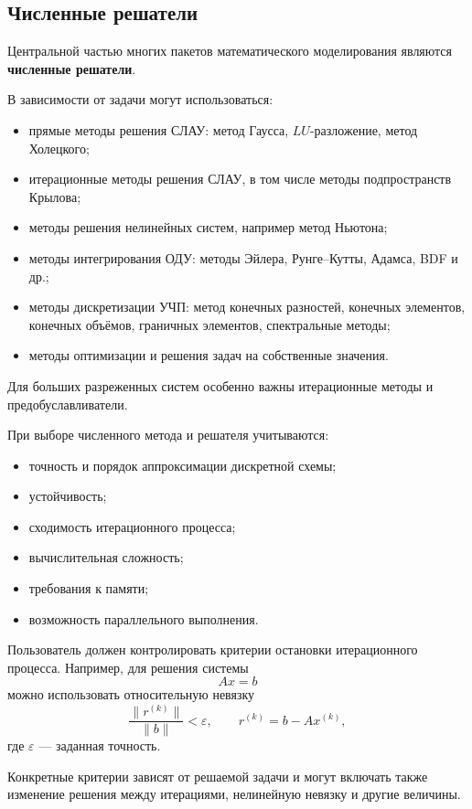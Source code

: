 \subsection{Численные решатели}

Центральной частью многих пакетов математического моделирования являются \textbf{численные решатели}.

В зависимости от задачи могут использоваться:
\begin{itemize}
	\item прямые методы решения СЛАУ: метод Гаусса, $LU$-разложение, метод Холецкого;
	\item итерационные методы решения СЛАУ, в том числе методы подпространств Крылова;
	\item методы решения нелинейных систем, например метод Ньютона;
	\item методы интегрирования ОДУ: методы Эйлера, Рунге--Кутты, Адамса, BDF и др.;
	\item методы дискретизации УЧП: метод конечных разностей, конечных элементов, конечных объёмов, граничных элементов, спектральные методы;
	\item методы оптимизации и решения задач на собственные значения.
\end{itemize}

Для больших разреженных систем особенно важны итерационные методы и предобуславливатели.

При выборе численного метода и решателя учитываются:
\begin{itemize}
	\item точность и порядок аппроксимации дискретной схемы;
	\item устойчивость;
	\item сходимость итерационного процесса;
	\item вычислительная сложность;
	\item требования к памяти;
	\item возможность параллельного выполнения.
\end{itemize}

Пользователь должен контролировать критерии остановки итерационного процесса. Например, для решения системы
\[
Ax=b
\]
можно использовать относительную невязку
\[
\frac{\|r^{(k)}\|}{\|b\|}<\varepsilon,
\qquad
r^{(k)}=b-Ax^{(k)},
\]
где $\varepsilon$ --- заданная точность.

Конкретные критерии зависят от решаемой задачи и могут включать также изменение решения между итерациями, нелинейную невязку и другие величины.

